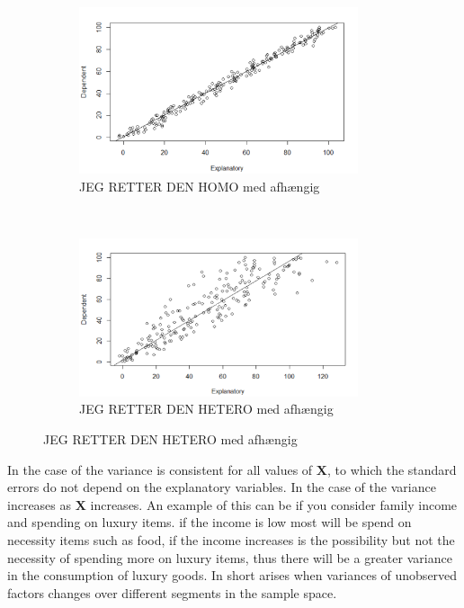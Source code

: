 \begin{figure}[h]
\centering
\begin{subfigure}[b]{0.4\textwidth}
    \centering
    \includegraphics[width = 0.9\textwidth]{figures/Thea/homoplot.png}
    \caption{JEG RETTER DEN HOMO med afhængig}
    \label{fig:homo_with_dependent_up_axis}
\end{subfigure}%
~
\begin{subfigure}[b]{0.4\textwidth}
\centering
    \includegraphics[width = 0.9\textwidth]{figures/Thea/Heteroplot.png}
    \caption{JEG RETTER DEN HETERO med afhængig}
    \label{fig:hetero_with_dependent_up_axis}
\end{subfigure}
\end{figure}


In the case of \homo the variance is consistent for all values of $\textbf{X}$, to which the standard errors do not depend on the explanatory variables. In the case of \hetero the variance increases as $\textbf{X}$ increases. An example of this can be if you consider family income and spending on luxury items. if the income is low most will be spend on necessity items such as food, if the income increases is the possibility but not the necessity of spending more on luxury items, thus there will be a greater variance in the consumption of luxury goods. In short \hetero arises when variances of unobserved factors changes over different segments in the sample space. 




